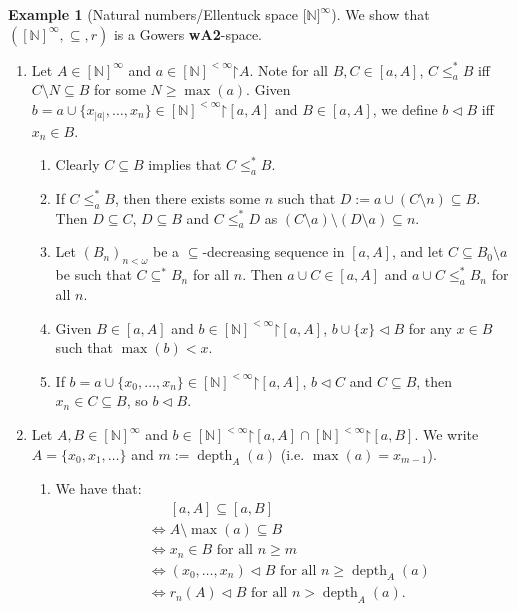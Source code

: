 \documentclass[11pt,reqno]{amsart}
\theoremstyle{plain}
\numberwithin{equation}{section}
\theoremstyle{definition}
\newtheorem{example}[theorem]{Example}
\newcommand{\func}{\operatorname}
\newcommand{\N}{\mathbb{N}}
\newcommand{\iffbreak}{\phantom{{} \iff {}}}
\newcommand{\restrictedto}{\mathord{\upharpoonright}}
\newcommand{\depth}{\func{depth}}
\begin{document}
\begin{example}[Natural numbers/Ellentuck space $\lbrack \N\rbrack^\infty$]
    We show that $([\N]^\infty,\subseteq,r)$ is a Gowers \textbf{wA2}-space.
    \begin{enumerate}
        \item[(\textbf{G1}-\textbf{5})] Let $A \in [\N]^\infty$ and $a \in [\N]^{<\infty}\restrictedto A$. Note for all $B,C \in [a,A]$, $C \leq_a^* B$ iff $C \setminus N \subseteq B$ for some $N \geq \max(a)$. Given $b = a \cup \{x_{|a|},\dots,x_n\} \in [\N]^{<\infty}\restrictedto[a,A]$ and $B \in [a,A]$, we define $b \lhd B$ iff $x_n \in B$.
        \begin{enumerate}[label=(\arabic*)]
            \item Clearly $C \subseteq B$ implies that $C \leq_a^* B$.
            
            \item If $C \leq_a^* B$, then there exists some $n$ such that $D := a \cup (C \setminus n) \subseteq B$. Then $D \subseteq C$, $D \subseteq B$ and $C \leq_a^* D$ as $(C \setminus a) \setminus (D \setminus a) \subseteq n$.
            
            \item Let $(B_n)_{n<\omega}$ be a $\subseteq$-decreasing sequence in $[a,A]$, and let $C \subseteq B_0 \setminus a$ be such that $C \subseteq^* B_n$ for all $n$. Then $a \cup C \in [a,A]$ and $a \cup C \leq_a^* B_n$ for all $n$.
            
            \item Given $B \in [a,A]$ and $b \in [\N]^{<\infty}\restrictedto[a,A]$, $b \cup \{x\} \lhd B$ for any $x \in B$ such that $\max(b) < x$.
            
            \item If $b = a \cup \{x_0,\dots,x_n\} \in [\N]^{<\infty}\restrictedto[a,A]$, $b \lhd C$ and $C \subseteq B$, then $x_n \in C \subseteq B$, so $b \lhd B$.
        \end{enumerate}

        \item[(\textbf{G6})] Let $A,B \in [\N]^\infty$ and $b \in [\N]^{<\infty}\restrictedto[a,A] \cap [\N]^{<\infty}\restrictedto[a,B]$. We write $A = \{x_0,x_1,\dots\}$ and $m := \depth_A(a)$ (i.e. $\max(a) = x_{m-1}$). 
        \begin{enumerate}[label=(\arabic*)]
            \item We have that:
            \begin{align*}
                &\iffbreak [a,A] \subseteq [a,B] \\
                &\iff A \setminus \max(a) \subseteq B \\
                &\iff x_n \in B \text{ for all $n \geq m$} \\
                &\iff (x_0,\dots,x_n) \lhd B \text{ for all $n \geq \depth_A(a)$} \\
                &\iff r_n(A) \lhd B \text{ for all $n > \depth_A(a)$}.
            \end{align*}


\end{enumerate}
\end{enumerate}
\end{example}
\end{document}
